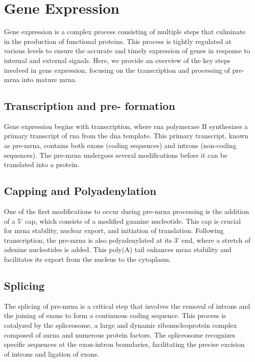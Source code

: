 \section{Gene Expression}
\label{sec:gene_expression}

Gene expression is a complex process consisting of multiple steps that
culminate in the production of functional proteins.
This process is tightly regulated at various levels to ensure the accurate and
timely expression of genes in response to internal and external signals.
Here, we provide an overview of the key steps involved in gene expression,
focusing on the transcription and processing of pre-\gls{mrna} into mature
\gls{mrna}.

\subsection{Transcription and pre- formation}
Gene expression begins with transcription, where \gls{rna} polymerase II
synthesizes a primary transcript of \gls{rna} from the \gls{dna} template.
This primary transcript, known as pre-\gls{mrna}, contains both exons (coding
sequences) and introns (non-coding sequences)\supercite{lee_mechanisms_2015}.
The pre-\gls{mrna} undergoes several modifications before it can be translated
into a protein.

\subsection{Capping and Polyadenylation}
One of the first modifications to occur during pre-\gls{mrna} processing is the
addition of a 5' cap, which consists of a modified guanine nucleotide.
This cap is crucial for \gls{mrna} stability, nuclear export, and initiation of
translation\supercite{topisirovic_cap_2011}.
Following transcription, the pre-\gls{mrna} is also polyadenylated at its 3'
end, where a stretch of adenine nucleotides is added.
This poly(A) tail enhances \gls{mrna} stability and facilitates its export from
the nucleus to the cytoplasm\supercite{passmore_roles_2022}.

\subsection{Splicing}
The splicing of pre-\gls{mrna} is a critical step that involves the removal of
introns and the joining of exons to form a continuous coding sequence.
This process is catalyzed by the spliceosome, a large and dynamic
ribonucleoprotein complex composed of \gls{snrna} and numerous protein
factors\supercite{lee_mechanisms_2015}.
The spliceosome recognizes specific sequences at the exon-intron boundaries,
facilitating the precise excision of introns and ligation of
exons\supercite{wang_splicing_2008}.

